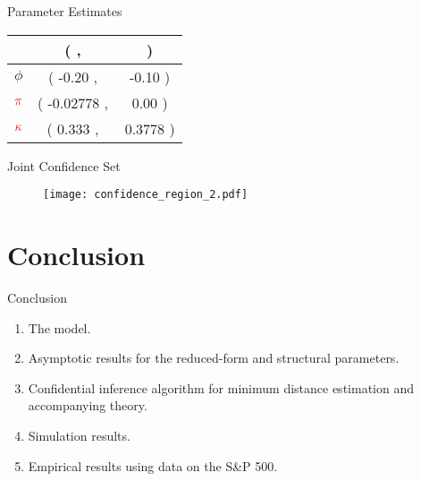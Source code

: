 \documentclass[smaller, aspectratio=169]{beamer}
\newcommand*{\rkappa}{\textcolor{red}{\kappa}}
\newcommand*{\rpi}{\textcolor{red}{\pi}}
\begin{document}
\begin{frame}[c]{Parameter Estimates}
\begin{minipage}{.49\textwidth}
\begin{table}[htb]
            \begin{tabularx}{.75\textwidth}{X | >{{(}} S[table-space-text-pre={(}] <{{,\,}}
              S[table-space-text-pre={\hspace{-1.5cm}}] <{{)}}}
%
            \toprule
            &  \\
            \midrule
            $\phi$   & -0.20 & -0.10    \\
            $\rpi$    & -0.02778 & 0.00   \\
            $\rkappa$   & 0.333 & 0.3778  \\
            \bottomrule 
          \end{tabularx}
        \end{table}
   \end{minipage}


\end{frame}



\begin{frame}[c]{Joint Confidence Set}
    \begin{figure}[htb]
    	
    	\centering
    	\label{fig:confidence_region}
    	
    	\texttt{[image: confidence\_region\_2.pdf]}
    \end{figure}

\end{frame}

\section{Conclusion}

\begin{frame}[c]{Conclusion}

  \begin{enumerate}
%
      \item[\cmark] The model.
      \bigskip
%
  \item[\cmark] Asymptotic results for the reduced-form and structural parameters.
      \bigskip
%
  \item[\cmark] Confidential inference algorithm for minimum distance estimation and accompanying theory. 
      \bigskip
%
    \item[\cmark] Simulation results. 
      \bigskip
%
    \item[\cmark] Empirical results using data on the S\&P 500.
%
  \end{enumerate}

\end{frame}
\end{document}
